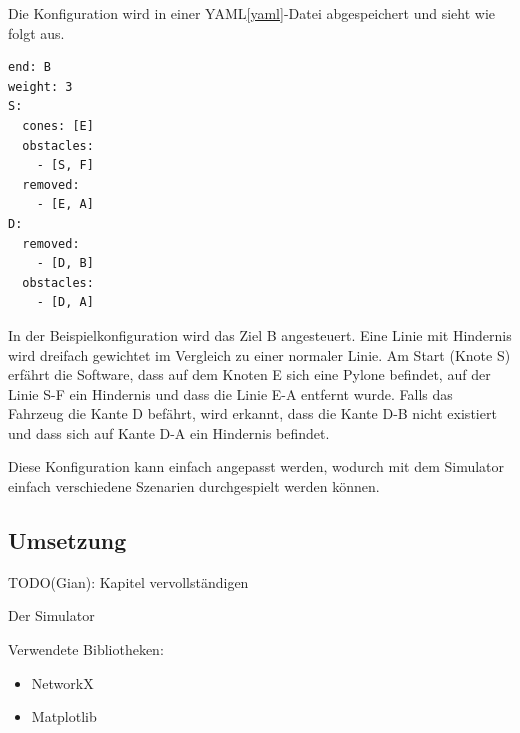 \documentclass[../main.tex]{subfiles}
\begin{document}

Die Konfiguration wird in einer YAML\ref{yaml}-Datei abgespeichert und sieht wie folgt aus.

\begin{verbatim}
end: B
weight: 3
S:
  cones: [E]
  obstacles: 
    - [S, F] 
  removed:
    - [E, A]
D:
  removed:
    - [D, B]
  obstacles:
    - [D, A]
\end{verbatim}

In der Beispielkonfiguration wird das Ziel B angesteuert.
Eine Linie mit Hindernis wird dreifach gewichtet im Vergleich zu einer normaler Linie.  
Am Start (Knote S) erfährt die Software, dass auf dem Knoten E sich eine Pylone befindet,
auf der Linie S-F ein Hindernis und dass die Linie E-A entfernt wurde.
Falls das Fahrzeug die Kante D befährt, wird erkannt, dass die Kante D-B nicht existiert und dass sich auf Kante D-A ein Hindernis befindet.

Diese Konfiguration kann einfach angepasst werden, wodurch mit dem Simulator einfach verschiedene Szenarien durchgespielt werden können.

\subsection{Umsetzung}

TODO(Gian): Kapitel vervollständigen

Der Simulator 

Verwendete Bibliotheken:

\begin{itemize}
    \item NetworkX
    \item Matplotlib
\end{itemize}
\end{document}

